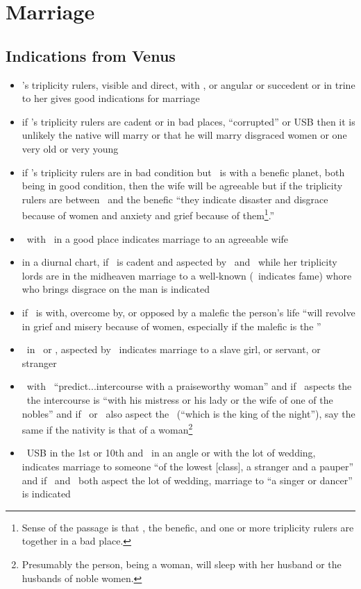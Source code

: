 \section{Marriage}
\subsection{Indications from Venus}
\begin{itemize}[topsep=0em,itemsep=0em]
\item \Venus's triplicity rulers, visible and direct, with \Venus, or angular or succedent or in trine to her gives good indications for marriage

\item if \Venus's triplicity rulers are cadent or in bad places, ``corrupted'' or USB then it is unlikely the native will marry or that he will marry disgraced women or one very old or very young

\item if \Venus's triplicity rulers are in bad condition but \Venus\, is with a benefic planet, both being in good condition, then the wife will be agreeable but if the triplicity rulers are between \Venus\, and the benefic ``they indicate disaster and disgrace because of women and anxiety and grief because of them\footnote{Sense of the passage is that \Venus, the benefic, and one or more triplicity rulers are together in a bad place.}.''

\item \Venus\, with \Jupiter\, in a good place indicates marriage to an agreeable wife

\item  in a diurnal chart, if \Venus\, is cadent and aspected by \Jupiter\, and \Mars\, while her triplicity lords are in the midheaven marriage to a well-known (\Jupiter\, indicates fame) whore who brings disgrace on the man is indicated

\item if \Venus\, is with, overcome by, or opposed by a malefic the person's life ``will revolve in grief and misery because of women, especially if the malefic is the \Moon''

\item \Mercury\, in \Taurus\, or \Libra, aspected by \Saturn\, indicates marriage to a slave girl, or servant, or stranger

\item \Jupiter\, with \Venus\, ``predict...intercourse with a praiseworthy woman'' and if \Jupiter\, aspects the \Moon\,  the intercourse is ``with his mistress or his lady or the wife of one of the nobles'' and if \Saturn\, or \Mars\, also aspect the \Moon\, (``which is the king of the night''), say the same if the nativity is that of a woman\footnote{Presumably the person, being a woman, will sleep with her husband or the husbands of noble women.}

\item \Venus\, USB in the 1st or 10th and \Mars\, in an angle or with the lot of wedding, indicates marriage to someone ``of the lowest [class], a stranger and a pauper'' and if \Mercury\, and \Venus\, both aspect the lot of wedding, marriage to ``a singer or dancer'' is indicated
\end{itemize}

